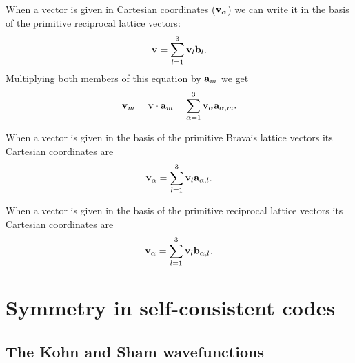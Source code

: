 \documentclass[12pt,a4paper,twoside]{report}
\begin{document}
When a vector is given in Cartesian coordinates
(${\bf v}_{\alpha}$) we can write it in the basis of the primitive reciprocal lattice vectors:
\begin{equation}
{\bf v}= \sum_{l=1}^3 {\bf v}_l {\bf b}_l.
\end{equation}
Multiplying both members of this equation by ${\bf a}_m$
we get
\begin{equation}
{\bf v}_m= {\bf v} \cdot {\bf a}_m=\sum_{\alpha=1}^3
{\bf v}_{\alpha} {\bf a}_{\alpha,m}.
\end{equation}

When a vector is given in the basis of the primitive Bravais lattice vectors its Cartesian coordinates are
\begin{equation}
{\bf v}_\alpha= \sum_{l=1}^3 {\bf v}_l {\bf a}_{\alpha,l}.
\end{equation}

When a vector is given in the basis of the primitive reciprocal lattice vectors its Cartesian coordinates are
\begin{equation}
{\bf v}_\alpha= \sum_{l=1}^3 {\bf v}_l {\bf b}_{\alpha,l}.
\end{equation}

{\color{dark-blue}\chapter{Symmetry in self-consistent codes}}
\color{black}

\section{The Kohn and Sham wavefunctions}
\end{document}
